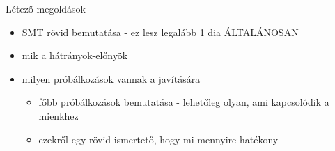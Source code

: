 \begin{frame}{Létező megoldások}
	
	\begin{itemize}
		\item
			SMT rövid bemutatása - ez lesz legalább 1 dia ÁLTALÁNOSAN
		\item
			mik a hátrányok-előnyök
		\item
			milyen próbálkozások vannak a javítására
		\begin{itemize}
			\item
				főbb próbálkozások bemutatása - lehetőleg olyan, ami kapcsolódik a mienkhez
			\item
				ezekről egy rövid ismertető, hogy mi mennyire hatékony
		\end{itemize}
	\end{itemize}
	
\end{frame}

